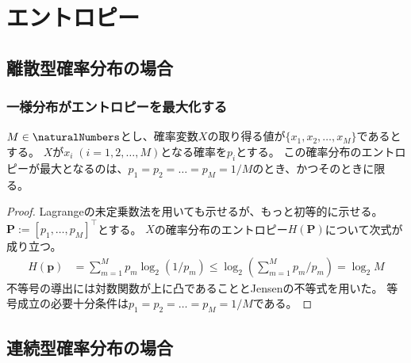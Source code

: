 \chapter{エントロピー}
    \section{離散型確率分布の場合}
        \subsection{一様分布がエントロピーを最大化する}
        \begin{shadebox}
            $M\in\naturalNumbers$とし、確率変数$X$の取り得る値が$\{x_1,x_2,\dots,x_M\}$であるとする。
            $X$が$x_i\;(i=1,2,\dots,M)$となる確率を$p_i$とする。
            この確率分布のエントロピーが最大となるのは、$p_1=p_2=\dots=p_M=1/M$のとき、かつそのときに限る。
        \end{shadebox}
        \begin{proof}
            \quad\par
            Lagrangeの未定乗数法を用いても示せるが、もっと初等的に示せる。
            $\bm{P} := [p_1,\dots,p_M]^\top$とする。
            $X$の確率分布のエントロピー$H(\bm{P})$について次式が成り立つ。
            \begin{align*}
                H(\bm{p}) &= \sum_{m=1}^M p_m\log_2 (1/p_m) \leq \log_2\left(\sum_{m=1}^M p_m/p_m\right) = \log_2 M
            \end{align*}
            不等号の導出には対数関数が上に凸であることとJensenの不等式を用いた。
            等号成立の必要十分条件は$p_1 = p_2 = \dots = p_M = 1/M$である。
        \end{proof}
    \section{連続型確率分布の場合}
